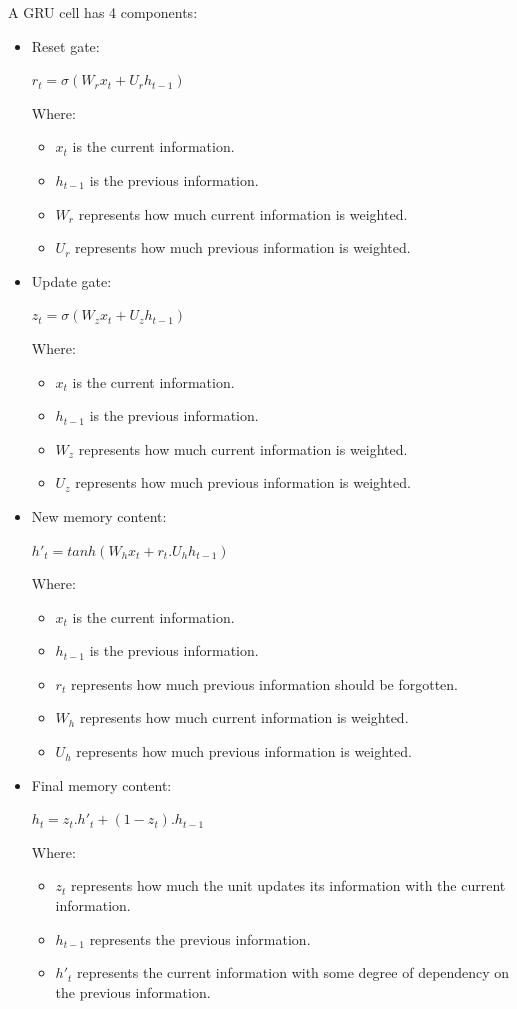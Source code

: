 \documentclass{ieeeojies}
\begin{document}
A GRU cell has 4 components:
\begin{itemize}
	\item Reset gate:
	\newline \centerline{$r_{t} = \sigma(W_{r}x_{t} + U_{r}h_{t-1})$}
	\newline Where:
	\begin{itemize}
		\item $x_{t}$ is the current information.
		\item $h_{t-1}$ is the previous information.
		\item $W_{r}$ represents how much current information is weighted.
		\item $U_{r}$ represents how much previous information is weighted.
	\end{itemize}
	\item Update gate:
	\newline \centerline{$z_{t} = \sigma(W_{z}x_{t} + U_{z}h_{t-1})$}
	\newline Where:
	\begin{itemize}
		\item $x_{t}$ is the current information.
		\item $h_{t-1}$ is the previous information.
		\item $W_{z}$ represents how much current information is weighted.
		\item $U_{z}$ represents how much previous information is weighted.
	\end{itemize}
	\item New memory content:
	\newline \centerline{$h'_{t} =  tanh(W_{h}x_{t} + r_{t}.U_{h}h_{t-1})$}
	\newline Where:
	\begin{itemize}
		\item $x_{t}$ is the current information.
		\item $h_{t-1}$ is the previous information.
		\item $r_{t}$ represents how much previous information should be forgotten.
		\item $W_{h}$ represents how much current information is weighted.
		\item $U_{h}$ represents how much previous information is weighted.
	\end{itemize}
	\item Final memory content:
	\newline \centerline{$h_{t} =  z_{t}.h'_{t} + (1 - z_{t}).h_{t-1}$}
	\newline Where:
	\begin{itemize}
		\item $z_{t}$ represents how much the unit updates its information with the current information.
		\item $h_{t-1}$ represents the previous information.
		\item $h'_{t}$ represents the current information with some degree of dependency on the previous information.
	\end{itemize}
\end{itemize}
\end{document}
